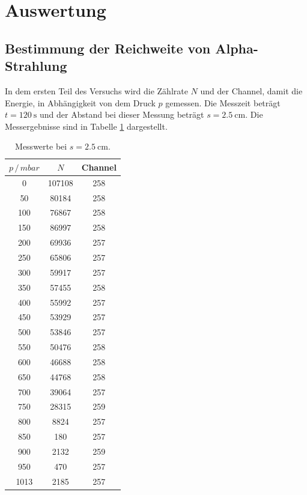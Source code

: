 \section{Auswertung}

\subsection{Bestimmung der Reichweite von Alpha-Strahlung}

In dem ersten Teil des Versuchs wird die Zählrate $N$ und der Channel, damit die
Energie, in Abhängigkeit von dem Druck $p$ gemessen. Die Messzeit beträgt $t = \SI{120}{\second}$
und der Abstand bei dieser Messung beträgt $s = \SI{2.5}{\centi\meter}$. Die Messergebnisse
sind in Tabelle \ref{tab:1} dargestellt.

\begin{table}[H]
  \centering
  \caption{Messwerte bei $s =  \SI{2.5}{\centi\meter}$.}
  \label{tab:1}
  \begin{tabular}{c c c}
    \toprule
    $p \, / \, mbar$ & $N$ & Channel \\
    \midrule
    0 & 107108 &  258 \\
   50 &  80184 &  258 \\
  100 &  76867 &  258 \\
  150 &  86997 &  258 \\
  200 &  69936 &  257 \\
  250 &  65806 &  257 \\
  300 &  59917 &  257 \\
  350 &  57455 &  258 \\
  400 &  55992 &  257 \\
  450 &  53929 &  257 \\
  500 &  53846 &  257 \\
  550 &  50476 &  258 \\
  600 &  46688 &  258 \\
  650 &  44768 &  258 \\
  700 &  39064 &  257 \\
  750 &  28315 &  259 \\
  800 &   8824 &  257 \\
  850 &    180 &  257 \\
  900 &   2132 &  259 \\
  950 &    470 &  257 \\
 1013 &   2185 &  257 \\
    \bottomrule
  \end{tabular}
\end{table}

